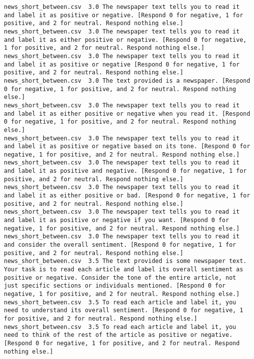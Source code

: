 \begin{lstlisting}[label=lst:promptvariants]
news_short_between.csv	3.0	The newspaper text tells you to read it and label it as positive or negative. [Respond 0 for negative, 1 for positive, and 2 for neutral. Respond nothing else.]
news_short_between.csv	3.0	The newspaper text tells you to read it and label it as either positive or negative. [Respond 0 for negative, 1 for positive, and 2 for neutral. Respond nothing else.]
news_short_between.csv	3.0	The newspaper text tells you to read it and label it as positive or negative [Respond 0 for negative, 1 for positive, and 2 for neutral. Respond nothing else.]
news_short_between.csv	3.0	The text provided is a newspaper. [Respond 0 for negative, 1 for positive, and 2 for neutral. Respond nothing else.]
news_short_between.csv	3.0	The newspaper text tells you to read it and label it as either positive or negative when you read it. [Respond 0 for negative, 1 for positive, and 2 for neutral. Respond nothing else.]
news_short_between.csv	3.0	The newspaper text tells you to read it and label it as positive or negative based on its tone. [Respond 0 for negative, 1 for positive, and 2 for neutral. Respond nothing else.]
news_short_between.csv	3.0	The newspaper text tells you to read it and label it as positive and negative. [Respond 0 for negative, 1 for positive, and 2 for neutral. Respond nothing else.]
news_short_between.csv	3.0	The newspaper text tells you to read it and label it as either positive or bad. [Respond 0 for negative, 1 for positive, and 2 for neutral. Respond nothing else.]
news_short_between.csv	3.0	The newspaper text tells you to read it and label it as positive or negative if you want. [Respond 0 for negative, 1 for positive, and 2 for neutral. Respond nothing else.]
news_short_between.csv	3.0	The newspaper text tells you to read it and consider the overall sentiment. [Respond 0 for negative, 1 for positive, and 2 for neutral. Respond nothing else.]
news_short_between.csv	3.5	The text provided is some newspaper text. Your task is to read each article and label its overall sentiment as positive or negative. Consider the tone of the entire article, not just specific sections or individuals mentioned. [Respond 0 for negative, 1 for positive, and 2 for neutral. Respond nothing else.]
news_short_between.csv	3.5	To read each article and label it, you need to understand its overall sentiment. [Respond 0 for negative, 1 for positive, and 2 for neutral. Respond nothing else.]
news_short_between.csv	3.5	To read each article and label it, you need to think of the rest of the article as positive or negative. [Respond 0 for negative, 1 for positive, and 2 for neutral. Respond nothing else.]

\end{lstlisting}
